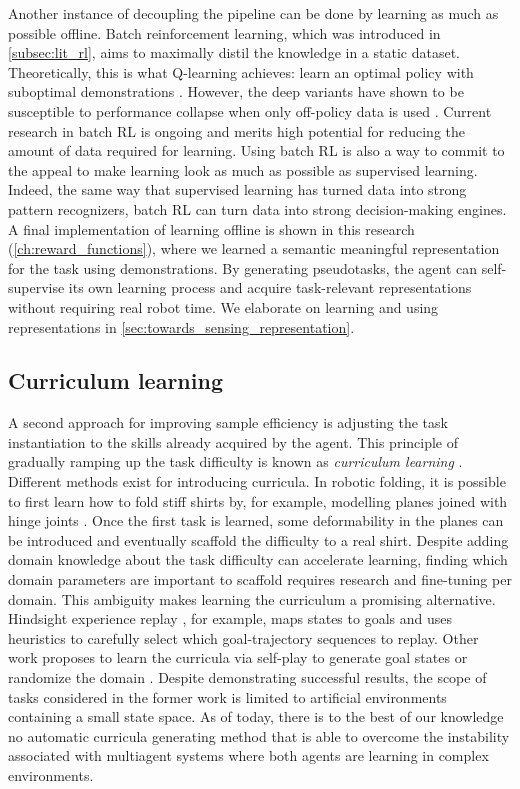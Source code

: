 \documentclass[\home/main.tex]{subfiles}
\begin{document}
Another instance of decoupling the pipeline can be done by learning as much as possible offline. Batch reinforcement learning, which was introduced in \cref{subsec:lit_rl}, aims to maximally distil the knowledge in a static dataset. Theoretically, this is what Q-learning achieves: learn an optimal policy with suboptimal demonstrations \autocite{Sutton2018}. However, the deep variants have shown to be susceptible to performance collapse when only off-policy data is used \autocite{hausknecht2016policy}. Current research in batch RL is ongoing and merits high potential for reducing the amount of data required for learning. Using batch RL is also a way to commit to the appeal to make learning look as much as possible as supervised learning. Indeed, the same way that supervised learning has turned data into strong pattern recognizers, batch RL can turn data into strong decision-making engines. 
A final implementation of learning offline is shown in this research (\cref{ch:reward_functions}), where we learned a semantic meaningful representation for the task using demonstrations. By generating pseudotasks, the agent can self-supervise its own learning process and acquire task-relevant representations without requiring real robot time. We elaborate on learning and using representations in \cref{sec:towards_sensing_representation}. 

\subsection{Curriculum learning}
A second approach for improving sample efficiency is adjusting the task instantiation to the skills already acquired by the agent. This principle of gradually ramping up the task difficulty is known as \emph{curriculum learning} \autocite{Selfridge1985}. Different methods exist for introducing curricula. In robotic folding, it is possible to first learn how to fold stiff shirts by, for example, modelling planes joined with hinge joints . Once the first task is learned, some deformability in the planes can be introduced and eventually scaffold the difficulty to a real shirt. Despite adding domain knowledge about the task difficulty can accelerate learning, finding which domain parameters are important to scaffold requires research and fine-tuning per domain. This ambiguity makes learning the curriculum a promising alternative.  
Hindsight experience replay \autocite{andrychowicz2017hindsight}, for example, maps states to goals and uses heuristics to carefully select which goal-trajectory sequences to replay. Other work proposes to learn the curricula via self-play to generate goal states \autocite{sukhbaatar2017intrinsic} or randomize the domain \autocite{raparthy2020generating}. Despite demonstrating successful results, the scope of tasks considered in the former work is limited to artificial environments containing a small state space. As of today, there is to the best of our knowledge no automatic curricula generating method that is able to overcome the instability associated with multiagent systems where both agents are learning in complex environments.
\end{document}

